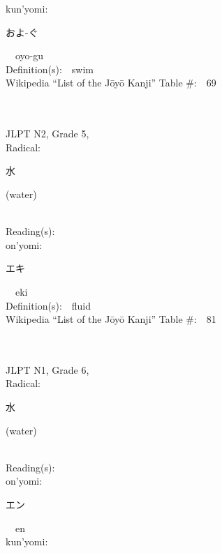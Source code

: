 \begin{multicols}{2}
{\hspace*{1em}}kun'yomi:\ \ \\
{\hspace*{2em}}{\begin{CJK}{UTF8}{min} およ-ぐ \end{CJK}}\ \ oyo-gu\ \ \\
Definition(s):\ \ swim \\
Wikipedia ``List of the J\=oy\=o Kanji'' Table \#:\ \ 69 \\
\ \ \\
{\fontsize{34pt}{40pt}  }\ \ \\  %
{JLPT N2, Grade 5, \\Radical:\ \ {\begin{CJK}{UTF8}{min} 水 \end{CJK}} (water) } \\
Reading(s):\ \ \\
{\hspace*{1em}}on'yomi:\ \ \\
{\hspace*{2em}}{\begin{CJK}{UTF8}{min} エキ \end{CJK}}\ \ eki\ \ \\
Definition(s):\ \ fluid \\
Wikipedia ``List of the J\=oy\=o Kanji'' Table \#:\ \ 81 \\
\ \ \\
{\fontsize{34pt}{40pt}  }\ \ \\  %
{JLPT N1, Grade 6, \\Radical:\ \ {\begin{CJK}{UTF8}{min} 水 \end{CJK}} (water) } \\
Reading(s):\ \ \\
{\hspace*{1em}}on'yomi:\ \ \\
{\hspace*{2em}}{\begin{CJK}{UTF8}{min} エン \end{CJK}}\ \ en\ \ \\
{\hspace*{1em}}kun'yomi:\ \ \\

\end{multicols}
